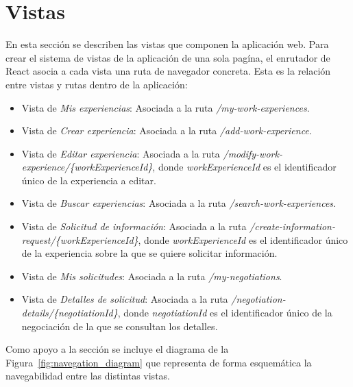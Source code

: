 \documentclass[a4paper, 12pt]{book}
\begin{document}
    \section{Vistas}
    \label{sec:views}
    En esta sección se describen las vistas que componen la aplicación web.
    Para crear el sistema de vistas de la aplicación de una sola pagína, el enrutador de React asocia a cada vista una ruta de navegador concreta. Esta es la relación entre vistas y rutas dentro de la aplicación:

    \begin{itemize}
        \item Vista de \emph{Mis experiencias}: Asociada a la ruta \emph{/my-work-experiences}.
        \item Vista de \emph{Crear experiencia}: Asociada a la ruta \emph{/add-work-experience}.
        \item Vista de \emph{Editar experiencia}: Asociada a la ruta \emph{/modify-work-experience/\{workExperienceId\}}, donde \emph{workExperienceId} es el identificador único de la experiencia a editar.
        \item Vista de \emph{Buscar experiencias}: Asociada a la ruta \emph{/search-work-experiences}.
        \item Vista de \emph{Solicitud de información}: Asociada a la ruta \emph{/create-information-request/\{workExperienceId\}},
        donde \emph{workExperienceId} es el identificador único de la experiencia sobre la que se quiere solicitar información.
        \item Vista de \emph{Mis solicitudes}: Asociada a la ruta \emph{/my-negotiations}.
        \item Vista de \emph{Detalles de solicitud}: Asociada a la ruta \emph{/negotiation-details/\{negotiationId\}},
        donde \emph{negotiationId} es el identificador único de la negociación de la que se consultan los detalles.
    \end{itemize}

    Como apoyo a la sección se incluye el diagrama de la Figura~\ref{fig:navegation_diagram} que representa de forma esquemática la navegabilidad entre las distintas vistas.
\end{document}
